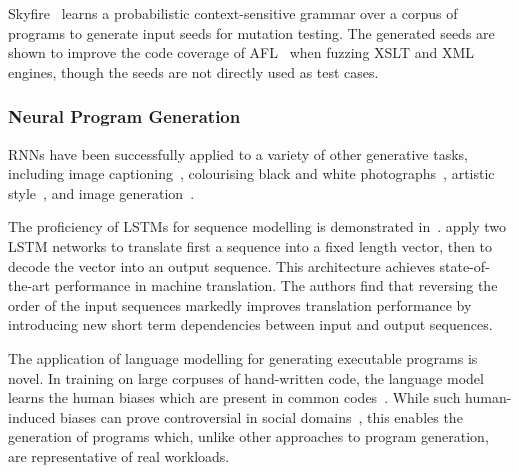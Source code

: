 Skyfire~\cite{Wang2017c} learns a probabilistic context-sensitive grammar over a corpus of programs to generate input seeds for mutation testing. The generated seeds are shown to improve the code coverage of AFL~\cite{Zalewski} when fuzzing XSLT and XML engines, though the seeds are not directly used as test cases.




\subsubsection{Neural Program Generation}


RNNs have been successfully applied to a variety of other generative tasks, including image captioning~\cite{Vinyals}, colourising black and white photographs~\cite{Zhang2016}, artistic style~\cite{Gatys2015}, and image generation~\cite{Gregor2014}.

The proficiency of LSTMs for sequence modelling is demonstrated in~\cite{Sutskever2014}. \citeauthor{Sutskever2014} apply two LSTM networks to translate first a sequence into a fixed length vector, then to decode the vector into an output sequence. This architecture achieves state-of-the-art performance in machine translation. The authors find that reversing the order of the input sequences markedly improves translation performance by introducing new short term dependencies between input and output sequences.

The application of language modelling for generating executable programs is novel. In training on large corpuses of hand-written code, the language model learns the human biases which are present in common codes~\cite{Caliskan-islam2016}. While such human-induced biases can prove controversial in social domains~\cite{Bolukbasi2016,Joseph2017}, this enables the generation of programs which, unlike other approaches to program generation, are representative of real workloads.

